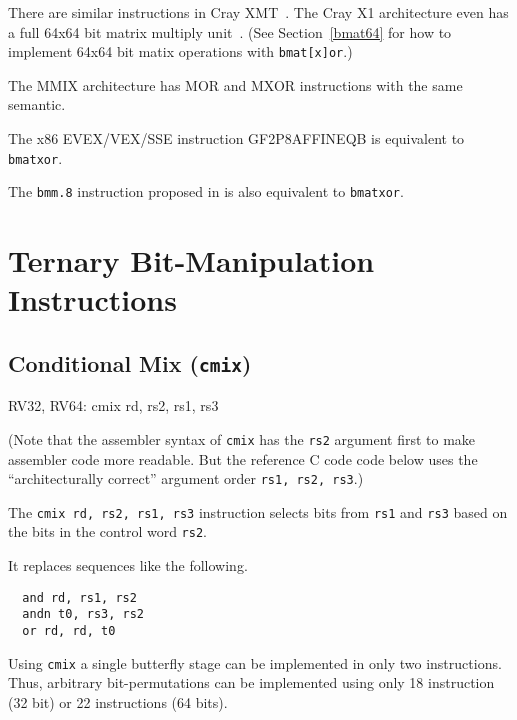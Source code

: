 There are similar instructions in Cray XMT~\cite{CrayXMT}. The Cray X1
architecture even has a full 64x64 bit matrix multiply unit~\cite{CrayX1}.
(See Section~\ref{bmat64} for how to implement 64x64 bit matix operations
with {\tt bmat[x]or}.)

The MMIX architecture has MOR and MXOR instructions with the same semantic.~\cite[p.~182f]{Knuth4A}

The x86 EVEX/VEX/SSE instruction GF2P8AFFINEQB is equivalent to {\tt bmatxor}.

The {\tt bmm.8} instruction proposed in \cite{Hilewitz08} is also equivalent to {\tt bmatxor}.


\section{Ternary Bit-Manipulation Instructions}


\subsection{Conditional Mix ({\tt cmix})}

\begin{rvb}
  RV32, RV64:
    cmix rd, rs2, rs1, rs3
\end{rvb}

(Note that the assembler syntax of {\tt cmix} has the {\tt rs2} argument first
to make assembler code more readable. But the reference C code code below uses
the ``architecturally correct'' argument order {\tt rs1, rs2, rs3}.)

The {\tt cmix rd, rs2, rs1, rs3} instruction selects bits from {\tt rs1} and {\tt rs3} based
on the bits in the control word {\tt rs2}.



It replaces sequences like the following.

\begin{minipage}{\linewidth}
\begin{verbatim}
  and rd, rs1, rs2
  andn t0, rs3, rs2
  or rd, rd, t0
\end{verbatim}
\end{minipage}

Using {\tt cmix} a single butterfly stage can be implemented in only two
instructions. Thus, arbitrary bit-permutations can be implemented using only
18 instruction (32 bit) or 22 instructions (64 bits).

